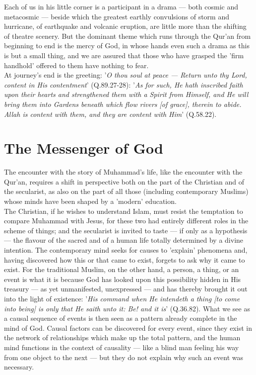 \documentclass[11pt, b5paper, twoside]{book}
\begin{document}
Each of us in his little corner is a participant in a drama --- both cosmic and metacosmic --- beside 
which the greatest earthly convulsions of storm and hurricane, of earthquake and volcanic eruption, 
are little more than the shifting of theatre scenery. But the dominant theme which runs through the 
Qur'an from beginning to end is the mercy of God, in whose hands even such a drama as this is but a 
small thing, and we are assured that those who have grasped the 'firm handhold' offered to them have 
nothing to fear. \\

At journey's end is the greeting: '\emph{O thou soul at peace --- Return unto thy Lord, content in His 
contentment}' (Q.89.27-28): '\emph{As for such, He hath inscribed faith upon their hearts and strengthened them with a Spirit from Himself, and He will bring them into Gardens beneath which flow rivers [of grace], therein to abide. Allah is content with them, and they are content with Him}' (Q.58.22). \\

\chapter{The Messenger of God}

The encounter with the story of Muhammad's life, like the encounter with the Qur'an, requires a shift 
in perspective both on the part of the Christian and of the secularist, as also on the part of all 
those (including contemporary Muslims) whose minds have been shaped by a 'modern' education. \\

The Christian, if he wishes to understand Islam, must resist the temptation to compare Muhammad with 
Jesus, for these two had entirely different roles in the scheme of things; and the secularist is 
invited to taste --- if only as a hypothesis --- the flavour of the sacred and of a human life totally 
determined by a divine intention. The contemporary mind seeks for causes to 'explain' phenomena and, 
having discovered how this or that came to exist, forgets to ask why it came to exist. For the 
traditional Muslim, on the other hand, a person, a thing, or an event is what it is because God has 
looked upon this possibility hidden in His treasury --- as yet unmanifested, unexpressed --- and has 
thereby brought it out into the light of existence: '\emph{His command when He intendeth a thing [to come into being] is only that He saith unto it: Be! and it is}' (Q.36.82). What we see as a causal sequence 
of events is then seen as a pattern already complete in the mind of God. Causal factors can be 
discovered for every event, since they exist in the network of relationships which make up the total 
pattern, and the human mind functions in the context of causality --- like a blind man feeling his way 
from one object to the next --- but they do not explain why such an event was necessary. \\
\end{document}
